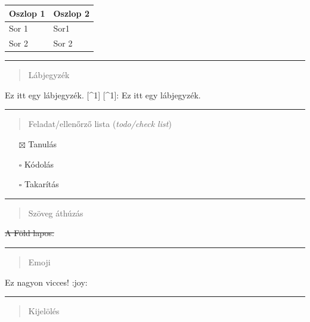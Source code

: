 \documentclass[
]{article}
\providecommand{\tightlist}{%
  \setlength{\itemsep}{0pt}\setlength{\parskip}{0pt}}
\begin{document}
\begin{longtable}[]{@{}ll@{}}
\toprule\noalign{}
Oszlop 1 & Oszlop 2 \\
\midrule\noalign{}
\endhead
\bottomrule\noalign{}
\endlastfoot
Sor 1 & Sor1 \\
Sor 2 & Sor 2 \\
\end{longtable}

\begin{center}\rule{0.5\linewidth}{0.5pt}\end{center}

\begin{quote}
Lábjegyzék
\end{quote}

Ez itt egy lábjegyzék. {[}\^{}1{]} {[}\^{}1{]}: Ez itt egy lábjegyzék.

\begin{center}\rule{0.5\linewidth}{0.5pt}\end{center}

\begin{quote}
Feladat/ellenőrző lista (\emph{todo/check list})
\end{quote}

\begin{itemize}
\tightlist
\item[$\boxtimes$]
  Tanulás
\item[$\square$]
  Kódolás
\item[$\square$]
  Takarítás
\end{itemize}

\begin{center}\rule{0.5\linewidth}{0.5pt}\end{center}

\begin{quote}
Szöveg áthúzás
\end{quote}

\st{A Föld lapos.}

\begin{center}\rule{0.5\linewidth}{0.5pt}\end{center}

\begin{quote}
Emoji
\end{quote}

Ez nagyon vicces! :joy:

\begin{center}\rule{0.5\linewidth}{0.5pt}\end{center}

\begin{quote}
Kijelölés
\end{quote}
\end{document}
